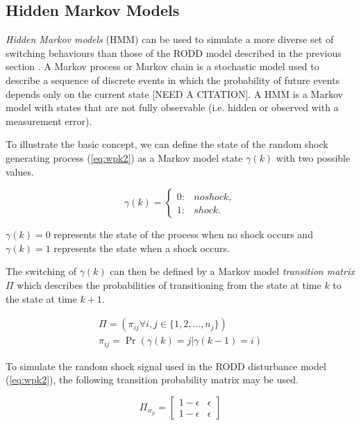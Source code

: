 \subsection{Hidden Markov Models}

\textit{Hidden Markov models} (HMM) can be used to simulate a more diverse set of switching behaviours than those of the RODD model described in the previous section \citep{wong_realistic_2009}. A Markov process or Markov chain is a stochastic model used to describe a sequence of discrete events in which the probability of future events depends only on the current state [NEED A CITATION]. A HMM is a Markov model with states that are not fully observable (i.e. hidden or observed with a measurement error).

To illustrate the basic concept, we can define the state of the random shock generating process (\ref{eq:wpk2}) as a Markov model state $\gamma(k)$ with two possible values.

\begin{equation} \label{eq:gamma-k}
	\gamma(k) = 
	\begin{cases*}
		0: & no shock, \\
		1: & shock.
	\end{cases*}
\end{equation}

$\gamma(k)=0$ represents the state of the process when no shock occurs and $\gamma(k)=1$ represents the state when a shock occurs.

The switching of $\gamma(k)$ can then be defined by a Markov model \textit{transition matrix} $\Pi$ which describes the probabilities of transitioning from the state at time $k$ to the state at time $k+1$.

\begin{equation} \label{eq:Pi}
	\begin{split}
	\Pi = \left(\pi_{ij} \forall i,j\in \{1,2,...,n_j\}\right) \\
	\pi_{ij}=\Pr\left(\gamma(k)=j|\gamma(k-1)=i\right)
	\end{split}
\end{equation}

To simulate the random shock signal used in the RODD disturbance model (\ref{eq:wpk2}), the following transition probability matrix may be used.

\begin{equation} \label{eq:Pi-RODD-step}
	\Pi_{w_{p}} = \begin{bmatrix}
	1-\epsilon & \epsilon \\
	1-\epsilon & \epsilon
	\end{bmatrix}
\end{equation}

